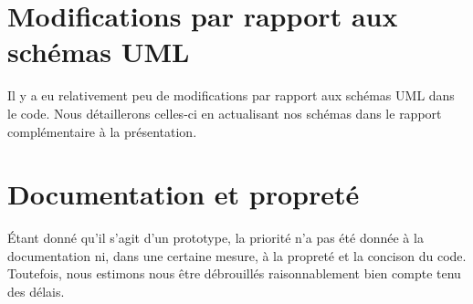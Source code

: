 \documentclass[a4paper,10pt]{article}
\begin{document}
\section{Modifications par rapport aux schémas UML}

Il y a eu relativement peu de modifications par rapport aux schémas UML dans le code. Nous détaillerons celles-ci en actualisant nos schémas dans le rapport complémentaire à la présentation.

\section{Documentation et propreté}

Étant donné qu'il s'agit d'un prototype, la priorité n'a pas été donnée à la documentation ni, dans une certaine mesure, à la propreté et la concison du code. Toutefois, nous estimons nous être débrouillés raisonnablement bien compte tenu des délais.
\end{document}
